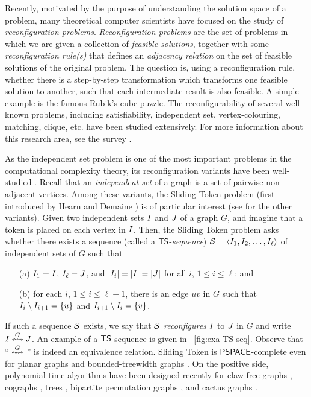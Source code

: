 \documentclass[a4paper]{llncs}
\begin{document}
Recently, motivated by the purpose of understanding the solution space of a problem, many theoretical computer scientists have focused on the study of \emph{reconfiguration problems}.
\emph{Reconfiguration problems} are the set of problems in which we are given a collection of
\emph{feasible solutions}, together with some \emph{reconfiguration rule(s)} that defines an \emph{adjacency relation} on the set of feasible solutions of the original problem. 
The question is, using a reconfiguration rule, whether there is a step-by-step transformation which transforms one feasible solution to another, such that each intermediate result is also feasible.
A simple example is the famous Rubik's cube puzzle.
The reconfigurability of several well-known problems, including 
	{\sc satisfiability},
	{\sc independent set},
	{\sc vertex-colouring}, 
	{\sc matching},
	{\sc clique}, etc.
	have been studied extensively.
For more information about this research area, see the survey \cite{Heuvel2013}.

As the {\sc independent set} problem is one of the most important problems in the computational complexity theory, its reconfiguration variants have been well-studied \cite{HearnDemaine2005,IDHPSUU,KaminskiMedvedevMilanic2012}.
Recall that an \emph{independent set} of a graph is a set of pairwise non-adjacent vertices.
Among these variants, the {\sc Sliding Token} problem (first introduced by Hearn and Demaine \cite{HearnDemaine2005}) is of particular interest (see \cite{KaminskiMedvedevMilanic2012} for the other variants).
Given two independent sets $I$ and $J$ of a graph $G$, 
	and imagine that a token is placed on each vertex in $I$. 
Then, the {\sc Sliding Token} problem asks
whether there exists a sequence (called a ${\sf TS}$-\emph{sequence}) 
${\cal S} = \langle I_1, I_2, \ldots, I_{\ell} \rangle$ of independent sets of $G$ such that

\begin{itemize}
\item [(a)] $I_1=I$, $I_{\ell}=J$, and ${\left|I_i\right|} = {\left|I\right|}={\left|J\right|}$ for all $i$, $1 \le i \le \ell$; and 

\item [(b)] for each $i$, $1 \le i \le \ell-1$, there is an edge $uv$ in $G$ such that $I_{i} \setminus I_{i+1}=\{u\}$ and $I_{i+1}\setminus I_{i}=\{v\}$.
\end{itemize}

\noindent
If such a sequence ${\cal S}$ exists, we say that ${\cal S}$ \emph{reconfigures} $I$ to $J$ in $G$ and write $I \overset{G}{\leftrightsquigarrow} J$. 
An example of a ${\sf TS}$-sequence is given in \figurename~\ref{fig:exa-TS-seq}. 
Observe that `` $\overset{G}{\leftrightsquigarrow}$ '' is indeed an equivalence relation.
{\sc Sliding Token} is $\sf PSPACE$-complete even for planar graphs \cite{HearnDemaine2005} and bounded-treewidth graphs \cite{MouawadNishimuraRamanWrochna}.
On the positive side, polynomial-time algorithms have been designed recently for claw-free graphs \cite{BonsmaKaminskiWrochna}, cographs \cite{KaminskiMedvedevMilanic2012}, trees \cite{DDFEHIOOUY2015}, bipartite permutation graphs \cite{FoxEpsteinHoangOtachiUehara2015}, and cactus graphs \cite{Hoang2016cactus}.
\end{document}
